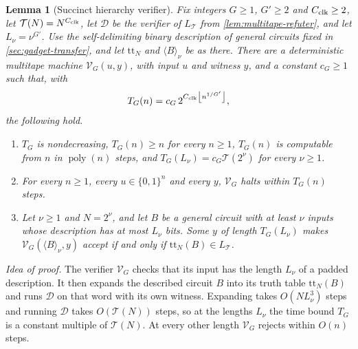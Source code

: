 \documentclass[11pt,letterpaper]{article}
\newtheorem{lemma}[theorem]{Lemma}
\theoremstyle{definition}
\theoremstyle{remark}
\newcommand{\poly}{\operatorname{poly}}
\newcommand{\floor}[1]{\left\lfloor #1\right\rfloor}
\newcommand{\Tclk}{\mathcal T}
\begin{document}
\begin{lemma}[Succinct hierarchy verifier]\label{lem:succinct-verifier}
Fix integers \(G\ge1\), \(G'\ge2\) and \(C_{\rm clk}\ge2\), let
\(\Tclk(N)=N^{C_{\rm clk}}\), let \(\mathcal D\) be the verifier of
\(L_{\Tclk}\) from \cref{lem:multitape-refuter}, and let
\(L_\nu=\nu^{G'}\). Use the self-delimiting binary description of
general circuits fixed in \cref{sec:gadget-transfer}, and let
\(\mathrm{tt}_N\) and \(\langle B\rangle_\nu\) be as there. There are a deterministic multitape machine
\(\mathcal V_G(u,y)\), with input \(u\) and witness \(y\), and a constant
\(c_G\ge1\) such that, with
\[
 T_G(n)=c_G\,2^{C_{\rm clk}\floor{n^{1/G'}}},
\]
the following hold.
\begin{enumerate}[label=(\roman*)]
\item \(T_G\) is nondecreasing, \(T_G(n)\ge n\) for every \(n\ge1\),
\(T_G(n)\) is computable from \(n\) in \(\poly(n)\) steps, and
\(T_G(L_\nu)=c_G\Tclk(2^\nu)\) for every \(\nu\ge1\).
\item For every \(n\ge1\), every \(u\in\{0,1\}^n\) and every \(y\),
\(\mathcal V_G\) halts within \(T_G(n)\) steps.
\item Let \(\nu\ge1\) and \(N=2^\nu\), and let \(B\) be a general circuit
with at least \(\nu\) inputs whose description has at most \(L_\nu\)
bits. Some \(y\) of length \(T_G(L_\nu)\) makes
\(\mathcal V_G(\langle B\rangle_\nu,y)\) accept if and only if
\(\mathrm{tt}_N(B)\in L_{\Tclk}\).
\end{enumerate}
\end{lemma}

\emph{Idea of proof.} The verifier \(\mathcal V_G\) checks that its
input has the length \(L_\nu\) of a padded description. It then expands
the described circuit \(B\) into its truth table \(\mathrm{tt}_N(B)\)
and runs \(\mathcal D\) on that word with its own witness. Expanding
takes \(O(NL_\nu^3)\) steps and running \(\mathcal D\) takes
\(O(\Tclk(N))\) steps, so at the lengths \(L_\nu\) the time bound
\(T_G\) is a constant multiple of \(\Tclk(N)\). At every other length
\(\mathcal V_G\) rejects within \(O(n)\) steps.
\end{document}
